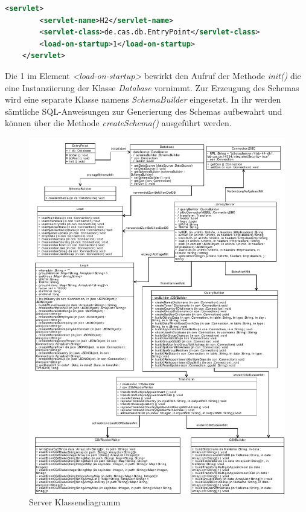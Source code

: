 \begin{lstlisting}[language=XML]
	<servlet>
		<servlet-name>H2</servlet-name>
		<servlet-class>de.cas.db.EntryPoint</servlet-class>
		<load-on-startup>1</load-on-startup>
	</servlet>
\end{lstlisting}

Die 1 im Element \textit{<load-on-startup>} bewirkt den Aufruf der Methode \textit{init()} die eine Instanziierung der Klasse \textit{Database} vornimmt. Zur Erzeugung des Schemas wird eine separate Klasse namens \textit{SchemaBuilder} eingesetzt. In ihr werden sämtliche SQL-Anweisungen zur Generierung des Schemas aufbewahrt und können über die Methode \textit{createSchema()} ausgeführt werden.

\begin{figure}[H]
\begin{center}
\includegraphics[width=1.0\textwidth]{pics/ServerKlassendiagramm.pdf}
\caption{Server Klassendiagramm}
\label{umsetzung_klassendiagramm_server}
\end{center}
\end{figure}

